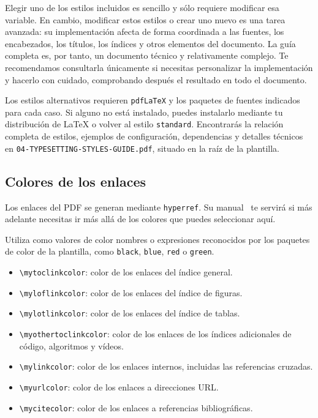 Elegir uno de los estilos incluidos es sencillo y sólo requiere modificar esa variable. En cambio, modificar estos estilos o crear uno nuevo es una tarea avanzada: su implementación afecta de forma coordinada a las fuentes, los encabezados, los títulos, los índices y otros elementos del documento. La guía completa es, por tanto, un documento técnico y relativamente complejo. Te recomendamos consultarla únicamente si necesitas personalizar la implementación y hacerlo con cuidado, comprobando después el resultado en todo el documento.

Los estilos alternativos requieren \texttt{pdfLaTeX} y los paquetes de fuentes indicados para cada caso. Si alguno no está instalado, puedes instalarlo mediante tu distribución de \LaTeX{} o volver al estilo \texttt{standard}. Encontrarás la relación completa de estilos, ejemplos de configuración, dependencias y detalles técnicos en \texttt{04-TYPESETTING-STYLES-GUIDE.pdf}, situado en la raíz de la plantilla.

\subsection{Colores de los enlaces}

Los enlaces del PDF se generan mediante \texttt{hyperref}. Su manual~\cite{hyperref-manual} te servirá si más adelante necesitas ir más allá de los colores que puedes seleccionar aquí.

Utiliza como valores de color nombres o expresiones reconocidos por los paquetes de color de la plantilla, como \texttt{black}, \texttt{blue}, \texttt{red} o \texttt{green}.

\begin{itemize}
  \item \texttt{\textbackslash{}mytoclinkcolor}: color de los enlaces del índice general.
  \item \texttt{\textbackslash{}myloflinkcolor}: color de los enlaces del índice de figuras.
  \item \texttt{\textbackslash{}mylotlinkcolor}: color de los enlaces del índice de tablas.
  \item \texttt{\textbackslash{}myothertoclinkcolor}: color de los enlaces de los índices adicionales de código, algoritmos y vídeos.
  \item \texttt{\textbackslash{}mylinkcolor}: color de los enlaces internos, incluidas las referencias cruzadas.
  \item \texttt{\textbackslash{}myurlcolor}: color de los enlaces a direcciones URL.
  \item \texttt{\textbackslash{}mycitecolor}: color de los enlaces a referencias bibliográficas.
\end{itemize}

